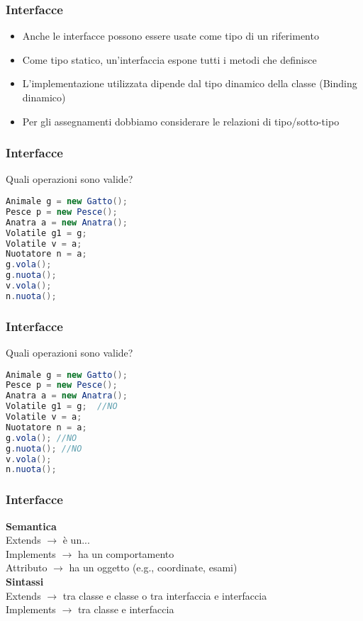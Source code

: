 \documentclass{beamer}
\begin{document}
\begin{frame}[fragile]
\frametitle{Interfacce}
 \begin{itemize}
 \item Anche le interfacce possono essere usate come tipo di un riferimento
 \item Come tipo statico, un'interfaccia espone tutti i metodi che definisce
 \item L'implementazione utilizzata dipende dal tipo dinamico della classe (Binding dinamico)
 \item Per gli assegnamenti dobbiamo considerare le relazioni di tipo/sotto-tipo
 \end{itemize}
\end{frame}

\begin{frame}[fragile]
\frametitle{Interfacce}
Quali operazioni sono valide?
\begin{lstlisting}[language=Java,escapechar=|]
Animale g = new Gatto(); 
Pesce p = new Pesce(); 
Anatra a = new Anatra(); 
Volatile g1 = g; 
Volatile v = a;
Nuotatore n = a;
g.vola();
g.nuota();
v.vola();
n.nuota();
\end{lstlisting}
\end{frame}

\begin{frame}[fragile]
\frametitle{Interfacce}
Quali operazioni sono valide?
\begin{lstlisting}[language=Java,escapechar=|]
Animale g = new Gatto(); 
Pesce p = new Pesce(); 
Anatra a = new Anatra(); 
Volatile g1 = g;  //NO
Volatile v = a;
Nuotatore n = a;
g.vola(); //NO
g.nuota(); //NO
v.vola(); 
n.nuota(); 
\end{lstlisting}
\end{frame}


\begin{frame}[fragile]
\frametitle{Interfacce}
\textbf{Semantica}\\
Extends $\rightarrow$ \`e un...\\
Implements $\rightarrow$ ha un comportamento\\
Attributo $\rightarrow$ ha un oggetto (e.g., coordinate, esami) \\
\vspace{1cm}
\textbf{Sintassi}\\
Extends $\rightarrow$ tra classe e classe o tra interfaccia e interfaccia\\
Implements $\rightarrow$ tra classe e interfaccia\\
\end{frame}
\end{document}
